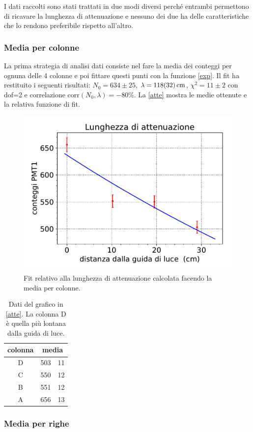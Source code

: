 I dati raccolti sono stati trattati in due modi diversi perché entrambi permettono di ricavare la lunghezza di attenuazione e nessuno dei due ha delle caratteristiche che lo rendono preferibile rispetto all'altro.

\subsubsection{Media per colonne}

La prima strategia di analisi dati consiste nel fare la media dei conteggi per ognuna delle 4 colonne e poi fittare questi punti con la funzione \eqref{exp}.
Il fit ha restituito i seguenti risultati: $N_0=634\pm25$,  $\lambda=\SI{118\pm32}{cm}$, $\chi^2=11\pm2$ con dof=2 e correlazione corr$(N_0,\lambda)=-\SI{80}\%$. 
La \autoref{atte} mostra le medie ottenute e la relativa funzione di fit.
\begin{figure}[h]
\centering
\includegraphics[width=8 cm]{atte}
\caption{Fit relativo alla lunghezza di attenuazione calcolata facendo la media per colonne.}
\label{atte}
\end{figure}

\begin{table}[h]
\centering
\begin{tabular}{| c | r @{$\pm$} l |}
\hline
colonna & \multicolumn{2}{c|}{media} \\
\hline
D & 503&11 \\
C & 550&12 \\
B & 551&12 \\
A & 656&13 \\
\hline
\end{tabular}
\caption{Dati del grafico in \autoref{atte}. La colonna D è quella più lontana dalla guida di luce.}
\end{table}

\subsubsection{Media per righe}

